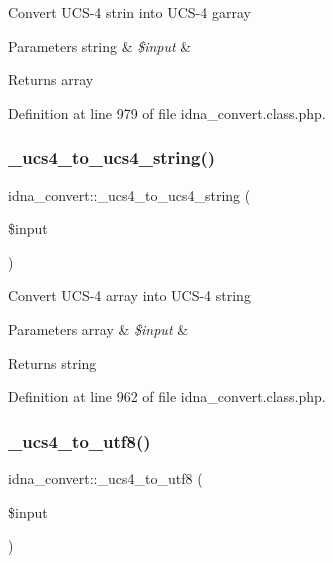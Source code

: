 Convert U\+C\+S-\/4 strin into U\+C\+S-\/4 garray


\begin{DoxyParams}[1]{Parameters}
string & {\em \$input} & \\
\hline
\end{DoxyParams}
\begin{DoxyReturn}{Returns}
array 
\end{DoxyReturn}


Definition at line 979 of file idna\+\_\+convert.\+class.\+php.

\hypertarget{classidna__convert_ac353a6fccbc4e8e15e90772acb6e2a74}{}\label{classidna__convert_ac353a6fccbc4e8e15e90772acb6e2a74} 
\subsubsection{\texorpdfstring{\+\_\+ucs4\+\_\+to\+\_\+ucs4\+\_\+string()}{\_ucs4\_to\_ucs4\_string()}}
{\footnotesize\ttfamily idna\+\_\+convert\+::\+\_\+ucs4\+\_\+to\+\_\+ucs4\+\_\+string (\begin{DoxyParamCaption}\item[{}]{\$input }\end{DoxyParamCaption})\hspace{0.3cm}{\ttfamily [protected]}}

Convert U\+C\+S-\/4 array into U\+C\+S-\/4 string


\begin{DoxyParams}[1]{Parameters}
array & {\em \$input} & \\
\hline
\end{DoxyParams}
\begin{DoxyReturn}{Returns}
string 
\end{DoxyReturn}


Definition at line 962 of file idna\+\_\+convert.\+class.\+php.

\hypertarget{classidna__convert_a3827709d9c0e35a164838064f73daea5}{}\label{classidna__convert_a3827709d9c0e35a164838064f73daea5} 
\subsubsection{\texorpdfstring{\+\_\+ucs4\+\_\+to\+\_\+utf8()}{\_ucs4\_to\_utf8()}}
{\footnotesize\ttfamily idna\+\_\+convert\+::\+\_\+ucs4\+\_\+to\+\_\+utf8 (\begin{DoxyParamCaption}\item[{}]{\$input }\end{DoxyParamCaption})\hspace{0.3cm}{\ttfamily [protected]}}

